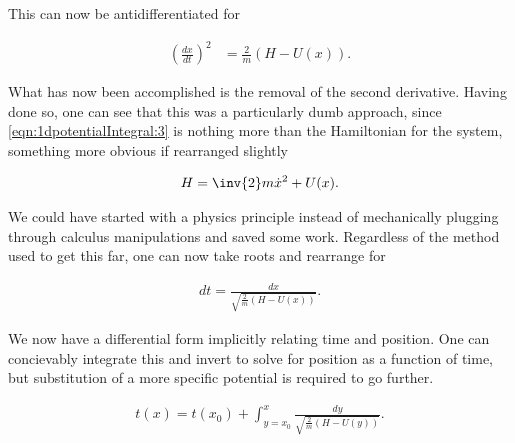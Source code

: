 This can now be antidifferentiated for

\begin{align}\label{eqn:1dpotentialIntegral:3}
\left( \frac{dx}{dt} \right)^2 &= \frac{2}{m} (H - U(x)).
\end{align}

What has now been accomplished is the removal of the second derivative.  Having done so, one can see that this was a particularly dumb approach, since \autoref{eqn:1dpotentialIntegral:3} is nothing more than the Hamiltonian for the system, something more obvious if rearranged slightly

\begin{align}\label{eqn:1dpotentialIntegral:3b}
H = \inv{2} m \dot{x}^2 + U(x).
\end{align}

We could have started with a physics principle instead of mechanically plugging through calculus manipulations and saved some work.  Regardless of the method used to get this far, one can now take roots and rearrange for

\begin{align}\label{eqn:1dpotentialIntegral:4}
dt = \frac{dx}{\sqrt{ \frac{2}{m} (H - U(x)) } }.
\end{align}

We now have a differential form implicitly relating time and position.  One can concievably integrate this and invert to solve for position as a function of time, but substitution of a more specific potential is required to go further.

\begin{align}\label{eqn:1dpotentialIntegral:5}
t(x) = t(x_0) + \int_{y=x_0}^{x} \frac{dy}{\sqrt{ \frac{2}{m} (H - U(y)) } }.
\end{align}


\EndNoBibArticle
